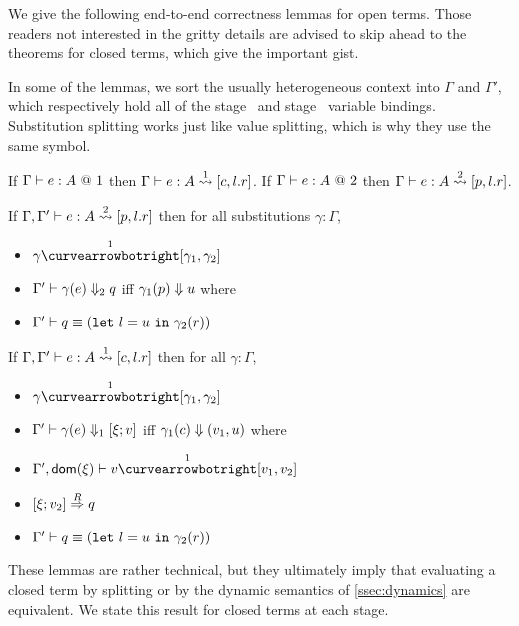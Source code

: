 We give the following end-to-end correctness lemmas for open terms. 
Those readers not interested in the gritty details are advised to skip ahead to the theorems for closed terms, which give the important gist.

In some of the lemmas, we sort the usually heterogeneous context into $\Gamma$ and $\Gamma'$, 
which respectively hold all of the stage \bbone\ and stage \bbtwo\ variable bindings.
Substitution splitting works just like value splitting, which is why they use the same symbol.

\begin{lemma}
If $\typesone e A$ then
$\Gamma\vdash e : A \splitonesym [c,l.r]$.
If $\typestwo e A$ then
$\Gamma\vdash e : A \splittwosym [p,l.r]$.
\end{lemma}

\begin{lemma}
If $\Gamma, \Gamma'\vdash e : A \splittwosym [p,l.r]$ then for all substitutions $\gamma : \Gamma$,
\begin{itemize}
\item $\gamma \vsplito [\gamma_1, \gamma_2]$
\item $\diatwo [\Gamma'] {\gamma(e)} q$ iff $\reduce {\gamma_1(p)} u$ where
\item $\Gamma' \vdash q \equiv (\letin{l}{u}{\gamma_2(r)})$
\end{itemize}
\end{lemma}

\begin{lemma}
If $\Gamma, \Gamma'\vdash e : A \splitonesym [c,l.r]$ then for all $\gamma : \Gamma$,
\begin{itemize}
\item $\gamma \vsplito [\gamma_1, \gamma_2]$
\item $\diaone [\Gamma'] {\gamma(e)} {\xi;v}$ iff $\reduce {\gamma_1(c)} {(v_1,u)}$ where
\item $\Gamma',\dom \xi \vdash v \vsplito [v_1,v_2]$
\item $\reify \xi {v_2} q$
\item $\Gamma'\vdash q \equiv (\letin{l}{u}{\gamma_2(r)})$
\end{itemize}
\end{lemma}

These lemmas are rather technical, but they ultimately imply that evaluating a
closed term by splitting or by the dynamic semantics of \ref{ssec:dynamics} are
equivalent. 
We state this result for closed terms at each stage.

